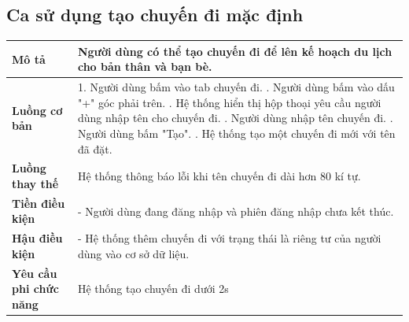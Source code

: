 \subsection{Ca sử dụng tạo chuyến đi mặc định}
\vspace{0.5cm}


\noindent 
\begin{tabularx}{\linewidth}{| l | X |} 
\hline 
\textbf{Mô tả} & Người dùng có thể tạo chuyến đi để lên kế hoạch du lịch cho bản thân và bạn bè. \\ 
\hline 
\textbf{Luồng cơ bản} & 1. Người dùng bấm vào tab chuyến đi. \newline
                        2. Người dùng bấm vào dấu "+" góc phải trên. \newline
                        3. Hệ thống hiển thị hộp thoại yêu cầu người dùng nhập tên cho chuyến đi. \newline
                        4. Người dùng nhập tên chuyến đi. \newline
                        5. Người dùng bấm "Tạo". \newline
                        6. Hệ thống tạo một chuyến đi mới với tên đã đặt. \\
                        
\hline 
\textbf{Luồng thay thế} & Hệ thống thông báo lỗi khi tên chuyến đi dài hơn 80 kí tự. \\

                       
\hline 
\textbf{Tiền điều kiện} &- Người dùng đang đăng nhập và phiên đăng nhập chưa kết thúc.
                         \\
\hline 
\textbf{Hậu điều kiện} & - Hệ thống thêm chuyến đi với trạng thái là riêng tư của người dùng vào cơ sở dữ liệu.\\

                       

\hline 
\textbf{Yêu cầu phi chức năng} & Hệ thống tạo chuyến đi dưới 2s \\ 
\hline 
\end{tabularx}



